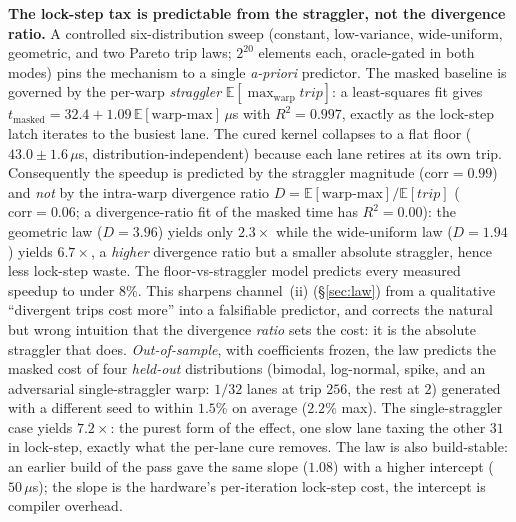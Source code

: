 \documentclass[sigplan,10pt]{acmart}
\begin{document}
\textbf{The lock-step tax is predictable from the straggler, not the divergence ratio.} A controlled six-distribution sweep (constant, low-variance, wide-uniform, geometric, and two Pareto trip laws; $2^{20}$ elements each, oracle-gated in both modes) pins the mechanism to a single \emph{a-priori} predictor. The masked baseline is governed by the per-warp \emph{straggler} $\mathbb{E}[\max_{\mathrm{warp}}\mathit{trip}]$: a least-squares fit gives $t_{\mathrm{masked}}=32.4+1.09\,\mathbb{E}[\text{warp-max}]\,\mu$s with $R^2=0.997$, exactly as the lock-step latch iterates to the busiest lane. The cured kernel collapses to a flat floor ($43.0\pm1.6\,\mu$s, distribution-independent) because each lane retires at its own trip. Consequently the speedup is predicted by the straggler magnitude ($\mathrm{corr}=0.99$) and \emph{not} by the intra-warp divergence ratio $D=\mathbb{E}[\text{warp-max}]/\mathbb{E}[\mathit{trip}]$ ($\mathrm{corr}=0.06$; a divergence-ratio fit of the masked time has $R^2=0.00$): the geometric law ($D=3.96$) yields only $2.3\times$ while the wide-uniform law ($D=1.94$) yields $6.7\times$, a \emph{higher} divergence ratio but a smaller absolute straggler, hence less lock-step waste. The floor-vs-straggler model predicts every measured speedup to under $8\%$. This sharpens channel~(ii) (\S\ref{sec:law}) from a qualitative ``divergent trips cost more'' into a falsifiable predictor, and corrects the natural but wrong intuition that the divergence \emph{ratio} sets the cost: it is the absolute straggler that does. \emph{Out-of-sample}, with coefficients frozen, the law predicts the masked cost of four \emph{held-out} distributions (bimodal, log-normal, spike, and an adversarial single-straggler warp: $1/32$ lanes at trip $256$, the rest at $2$) generated with a different seed to within $1.5\%$ on average ($2.2\%$ max). The single-straggler case yields $7.2\times$: the purest form of the effect, one slow lane taxing the other $31$ in lock-step, exactly what the per-lane cure removes. The law is also build-stable: an earlier build of the
pass gave the same slope ($1.08$) with a higher intercept ($50\,\mu$s); the slope is the hardware's
per-iteration lock-step cost, the intercept is compiler overhead.
\end{document}
